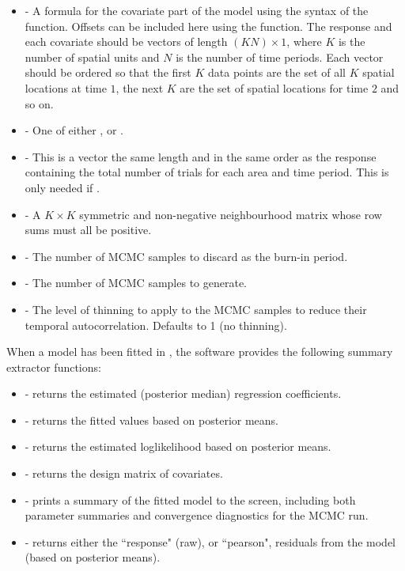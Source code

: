 \documentclass[article, nojss]{jss}
\begin{document}
\begin{itemize}
\item {} - A formula for the covariate part of the model using the syntax of the  function. Offsets can be included here using the  function. The response and each covariate should be vectors of length $(KN)\times 1$, where $K$ is the number of spatial units and $N$ is the number of time periods. Each vector should be ordered so that the first $K$ data points are the set of all $K$ spatial locations at time $1$, the next $K$ are the set of spatial locations for time $2$ and so on. 

\item {} - One of either ,  or .


\item {} - This is a vector the same length and in the same order as the response containing the total number of trials  for each area and time period. This is only needed if  .

\item {} - A $K \times K$ symmetric and non-negative neighbourhood matrix whose row sums must all be positive.

\item {} - The number of MCMC samples to discard as the burn-in period.
    
\item {} - The number of MCMC samples to generate.

\item {} - The level of thinning to apply to the MCMC samples to reduce their temporal 
autocorrelation. Defaults to 1 (no thinning).
\end{itemize}

When a model has been fitted in , the software provides the following summary extractor functions: 


\begin{itemize}
\item {} - returns the estimated (posterior median) regression coefficients. 
\item {} - returns the fitted values based on posterior means.
\item {} - returns the estimated loglikelihood based on posterior means.
\item {} - returns the design matrix of covariates.
\item {} - prints a summary of the fitted model to the screen, including both parameter summaries and convergence diagnostics for the MCMC run.
\item {} - returns either the ``response" (raw), or ``pearson", residuals from the model (based on posterior means).
\end{itemize}
\end{document}
